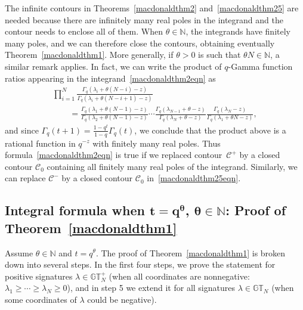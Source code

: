 \documentclass[11pt]{article}
\numberwithin{equation}{section}
\newcommand{\N}{\mathbb{N}}
\newcommand{\CC}{\mathcal{C}}
\newcommand{\GT}{\mathbb{GT}}
\newcommand{\GTp}{\mathbb{GT}^+}
\begin{document}
\begin{rem}\label{macdonaldthetaNinteger}
The inf\/inite contours in Theorems~\ref{macdonaldthm2} and~\ref{macdonaldthm25} are needed because there are inf\/initely many real poles in the integrand and the contour needs to enclose all of them. When $\theta\in\N$, the integrands have f\/initely many poles, and we can therefore close the contours, obtaining eventually Theorem~\ref{macdonaldthm1}. More generally, if $\theta > 0$ is such that $\theta N \in\N$, a similar remark applies. In fact, we can write the product of $q$-Gamma function ratios appearing in the integrand~\eqref{macdonaldthm2eqn} as
\begin{gather}
\prod_{i=1}^N{\frac{\Gamma_q(\lambda_i + \theta(N-i)-z)}{\Gamma_q(\lambda_i + \theta(N-i+1)-z)}}\nonumber\\
 \qquad{} = \frac{\Gamma_q(\lambda_1 + \theta(N-1) - z)}{\Gamma_q(\lambda_2 + \theta(N-1)-z)}\cdots\frac{\Gamma_q(\lambda_{N-1} + \theta - z)}{\Gamma_q(\lambda_N + \theta-z)}\frac{\Gamma_q(\lambda_N - z)}{\Gamma_q(\lambda_1 + \theta N - z)},\label{ratioqgammas}
\end{gather}
and since $\Gamma_q(t+1) = \frac{1 - q^t}{1 - q}\Gamma_q(t)$, we conclude that the product above is a rational function in $q^{-z}$ with f\/initely many real poles. Thus formula~\eqref{macdonaldthm2eqn} is true if we replaced contour~$\CC^+$ by a closed contour $\CC_0$ containing all f\/initely many real poles of the integrand. Similarly, we can replace $\CC^-$ by a closed contour $\CC_0$ in~\eqref{macdonaldthm25eqn}.
\end{rem}

\setcounter{section}{3}
\setcounter{subsection}{2}
\setcounter{subsubsection}{0}
\setcounter{thm}{7}
\setcounter{equation}{5}
\subsection[Integral formula when $t = q^{\theta}$, $\theta\in\N$: Proof of Theorem~\ref{macdonaldthm1}]{Integral formula when $\boldsymbol{t = q^{\theta}}$, $\boldsymbol{\theta\in\N}$: Proof of Theorem~\ref{macdonaldthm1}}\label{proofthm1macdonald}

Assume $\theta\in\N$ and $t = q^{\theta}$. The proof of Theorem~\ref{macdonaldthm1} is broken down into several steps. In the f\/irst four steps, we prove the statement for positive signatures $\lambda\in\GTp_N$ (when all coordinates are nonnegative: $\lambda_1 \geq \cdots \geq \lambda_N \geq 0$), and in step 5 we extend it for all signatures $\lambda\in\GT_N$ (when some coordinates of $\lambda$ could be negative).
\end{document}
